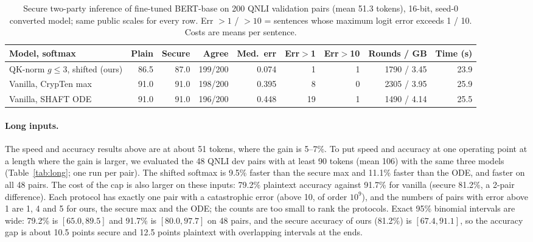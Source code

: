 \documentclass[11pt]{article}
\begin{document}
\begin{table}[tbp]\centering\footnotesize\setlength{\tabcolsep}{4pt}
\caption{Secure two-party inference of fine-tuned BERT-base on 200 QNLI validation pairs (mean 51.3 tokens), 16-bit, seed-0 converted
model; same public scales for every row. Err $>1$ / $>10$ = sentences whose maximum logit error exceeds 1 / 10. Costs are means per sentence.}\label{tab:qnli}
\begin{tabular}{@{}lrrrrrrrr@{}}\toprule
Model, softmax & Plain & Secure & Agree & Med.\ err & Err$>$1 & Err$>$10 & Rounds / GB & Time (s)\\\midrule
QK-norm $g\le3$, shifted (ours) & 86.5 & 87.0 & 199/200 & 0.074 & 1 & 1 & 1790 / 3.45 & 23.9\\
Vanilla, CrypTen max & 91.0 & 91.0 & 198/200 & 0.395 & 8 & 0 & 2305 / 3.95 & 25.9\\
Vanilla, SHAFT ODE & 91.0 & 91.0 & 196/200 & 0.448 & 19 & 1 & 1490 / 4.14 & 25.5\\\bottomrule
\end{tabular}
\end{table}

\paragraph{Long inputs.} The speed and accuracy results above are at about 51 tokens, where the gain is 5--7\%. To put speed and accuracy at one operating point at a length where the gain is larger, we evaluated the 48 QNLI dev pairs with at least 90 tokens (mean 106) with the same three models (Table~\ref{tab:long}; one run per pair). The shifted softmax is 9.5\% faster than the secure max and 11.1\% faster than the ODE, and faster on all 48 pairs. The cost of the cap is also larger on these inputs: 79.2\% plaintext accuracy against 91.7\% for vanilla (secure 81.2\%, a 2-pair difference). Each protocol has exactly one pair with a catastrophic error (above 10, of order $10^{9}$), and the numbers of pairs with error above 1 are 1, 4 and 5 for ours, the secure max and the ODE; the counts are too small to rank the protocols. Exact 95\% binomial intervals are wide: 79.2\% is $[65.0,89.5]$ and 91.7\% is $[80.0,97.7]$ on 48 pairs, and the secure accuracy of ours (81.2\%) is $[67.4,91.1]$, so the accuracy gap is about 10.5 points secure and 12.5 points plaintext with overlapping intervals at the ends.
\end{document}
